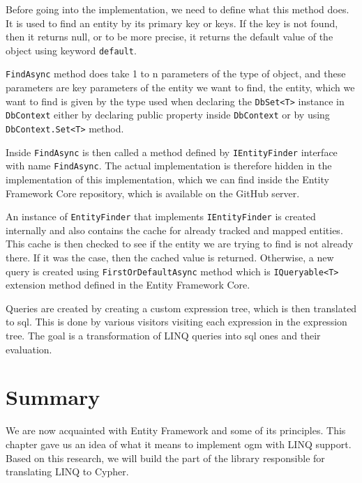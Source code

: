 Before going into the implementation, we need to define what this method does. It is used to find an entity by its primary key or keys.
If the key is not found, then it returns null, or to be more precise, it returns the default value of the object using keyword \texttt{default}.

\texttt{FindAsync} method does take 1 to n parameters of the type of object, and these parameters are key parameters of the entity we want to find, the entity,
which we want to find is given by the type used when declaring the \texttt{DbSet<T>} instance in \texttt{DbContext} either by declaring public property inside \texttt{DbContext}
or by using \texttt{DbContext.Set<T>} method.

Inside \texttt{FindAsync} is then called a method defined by \texttt{IEntityFinder} interface with name \texttt{FindAsync}.
The actual implementation is therefore hidden in the implementation of this implementation, which we can find inside the Entity Framework Core repository, which is available
on the GitHub server.

An instance of \texttt{EntityFinder} that implements \texttt{IEntityFinder} is created internally and also contains the cache for already tracked and mapped entities.
This cache is then checked to see if the entity we are trying to find is not already there. If it was the case, then the cached value is returned. Otherwise, a new query is created
using \texttt{FirstOrDefaultAsync} method which is \texttt{IQueryable<T>} extension method defined in the Entity Framework Core.

Queries are created by creating a custom expression tree, which is then translated to \acrshort{sql}. This is done by various visitors visiting each expression
in the expression tree. The goal is a transformation of LINQ queries into \acrshort{sql} ones and their evaluation.

\section {Summary}

We are now acquainted with Entity Framework and some of its principles. This chapter gave us an idea of what it means to implement
\acrshort{ogm} with LINQ support. Based on this research, we will build the part of the library responsible for translating LINQ to Cypher.